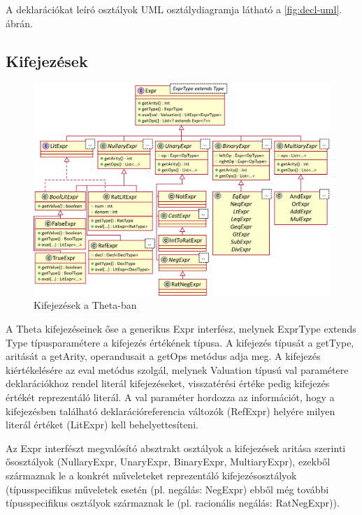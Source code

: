 A deklarációkat leíró osztályok UML osztálydiagramja látható a \ref{fig:decl-uml}. ábrán.

\subsection{Kifejezések}

\begin{figure}%
    \centering
    \includegraphics[width=\textwidth, keepaspectratio]{src/figures/expr-uml.png}
    \caption{Kifejezések a Theta-ban}
    \label{fig:expr-uml}
\end{figure}

A Theta kifejezéseinek őse a generikus \textsf{Expr} interfész, melynek \textsf{ExprType extends Type} típusparamétere a kifejezés értékének típusa. A kifejezés típusát a \textsf{getType}, aritását a \textsf{getArity}, operandusait a \textsf{getOps} metódus adja meg. A kifejezés kiértékelésére az \textsf{eval} metódus szolgál, melynek \textsf{Valuation} típusú \textsf{val} paramétere deklarációkhoz rendel literál kifejezéseket, visszatérési értéke pedig kifejezés értékét reprezentáló literál. A \textsf{val} paraméter hordozza az információt, hogy a kifejezésben található deklarációreferencia változók (\textsf{RefExpr}) helyére milyen literál értéket (\textsf{LitExpr}) kell behelyettesíteni.

Az \textsf{Expr} interfészt megvalósító absztrakt osztályok a kifejezések aritása szerinti ősosztályok (\textsf{NullaryExpr}, \textsf{UnaryExpr}, \textsf{BinaryExpr}, \textsf{MultiaryExpr}), ezekből származnak le a konkrét műveleteket reprezentáló kifejezésosztályok (típusspecifikus műveletek esetén (pl. negálás: \textsf{NegExpr}) ebből még további típusspecifikus osztályok származnak le (pl. racionális negálás: \textsf{RatNegExpr})).

